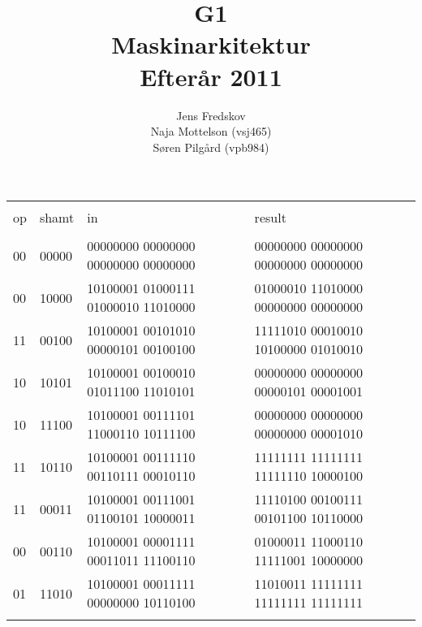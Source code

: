 \documentclass[10pt,a4paper,danish]{article}
\title{G1\\Maskinarkitektur\\Efterår 2011}
\author{Jens Fredskov\\ Naja Mottelson (vsj465)\\Søren Pilgård (vpb984)}
\begin{document}
\begin{tabular}{l l l | l}
  \hline\\
  op & shamt & in & result\\
  \hline\\
  00 & 00000 & 00000000 00000000 00000000 00000000 & 00000000 00000000 00000000 00000000\\
  00 & 10000 & 10100001 01000111 01000010 11010000 & 01000010 11010000 00000000 00000000\\
  11 & 00100 & 10100001 00101010 00000101 00100100 & 11111010 00010010 10100000 01010010\\
  10 & 10101 & 10100001 00100010 01011100 11010101 & 00000000 00000000 00000101 00001001\\
  10 & 11100 & 10100001 00111101 11000110 10111100 & 00000000 00000000 00000000 00001010\\
  11 & 10110 & 10100001 00111110 00110111 00010110 & 11111111 11111111 11111110 10000100\\
  11 & 00011 & 10100001 00111001 01100101 10000011 & 11110100 00100111 00101100 10110000\\
  00 & 00110 & 10100001 00001111 00011011 11100110 & 01000011 11000110 11111001 10000000\\
  01 & 11010 & 10100001 00011111 00000000 10110100 & 11010011 11111111 11111111 11111111\\
  \hline\\
\end{tabular}
\end{document}
